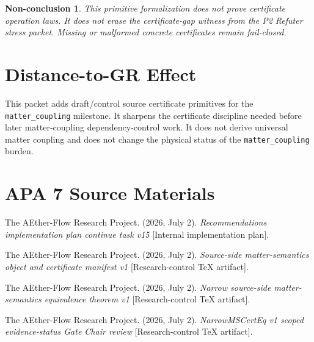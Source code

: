 \documentclass[11pt]{article}
\newtheorem{nonconclusion}{Non-conclusion}
\begin{document}
\begin{nonconclusion}
This primitive formalization does not prove certificate operation laws. It
does not erase the certificate-gap witness from the P2 Refuter stress packet.
Missing or malformed concrete certificates remain fail-closed.
\end{nonconclusion}

\section{Distance-to-GR Effect}

This packet adds draft/control source certificate primitives for the
\texttt{matter\_coupling} milestone. It sharpens the certificate discipline
needed before later matter-coupling dependency-control work. It does not
derive universal matter coupling and does not change the physical status of
the \texttt{matter\_coupling} burden.

\section{APA 7 Source Materials}

The AEther-Flow Research Project. (2026, July 2). \textit{Recommendations
implementation plan continue task v15} [Internal implementation plan].

The AEther-Flow Research Project. (2026, July 2). \textit{Source-side
matter-semantics object and certificate manifest v1} [Research-control TeX
artifact].

The AEther-Flow Research Project. (2026, July 2). \textit{Narrow source-side
matter-semantics equivalence theorem v1} [Research-control TeX artifact].

The AEther-Flow Research Project. (2026, July 2). \textit{NarrowMSCertEq
v1 scoped evidence-status Gate Chair review} [Research-control TeX artifact].
\end{document}
